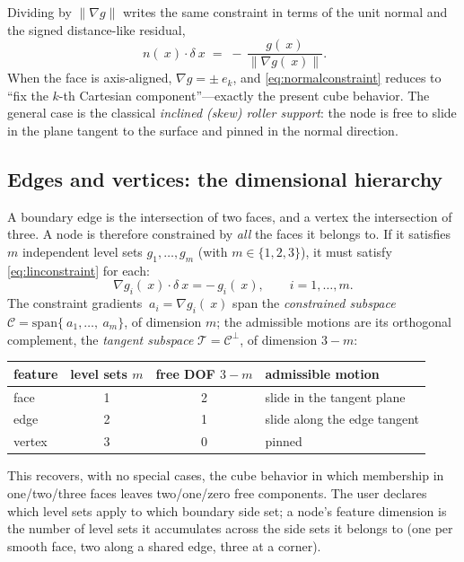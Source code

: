 \documentclass[11pt]{article}
\newcommand{\grad}{\nabla}
\newcommand{\norm}[1]{\lVert #1 \rVert}
\begin{document}
Dividing by $\norm{\grad g}$ writes the same constraint in terms of the unit
normal and the signed distance-like residual,
\begin{equation}
  ~n(~x)\cdot\delta~x \;=\; -\,\frac{g(~x)}{\norm{\grad g(~x)}}.
  \label{eq:normalconstraint}
\end{equation}
When the face is axis-aligned, $\grad g = \pm~e_k$, and
\eqref{eq:normalconstraint} reduces to ``fix the $k$-th Cartesian
component''---exactly the present cube behavior. The general case is the
classical \emph{inclined (skew) roller support}: the node is free to slide in
the plane tangent to the surface and pinned in the normal direction.

\subsection{Edges and vertices: the dimensional hierarchy}

A boundary edge is the intersection of two faces, and a vertex the intersection
of three. A node is therefore constrained by \emph{all} the faces it belongs
to. If it satisfies $m$ independent level sets $g_1,\dots,g_m$ (with
$m\in\{1,2,3\}$), it must satisfy \eqref{eq:linconstraint} for each:
\begin{equation}
  \grad g_i(~x)\cdot\delta~x = -\,g_i(~x), \qquad i = 1,\dots,m.
  \label{eq:multiconstraint}
\end{equation}
The constraint gradients $~a_i = \grad g_i(~x)$ span the \emph{constrained
subspace} $\mathcal{C} = \mathrm{span}\{~a_1,\dots,~a_m\}$, of dimension $m$;
the admissible motions are its orthogonal complement, the \emph{tangent
subspace} $\mathcal{T} = \mathcal{C}^\perp$, of dimension $3-m$:

\begin{center}
\begin{tabular}{lccl}
\toprule
feature & level sets $m$ & free DOF $3-m$ & admissible motion \\
\midrule
face   & 1 & 2 & slide in the tangent plane \\
edge   & 2 & 1 & slide along the edge tangent \\
vertex & 3 & 0 & pinned \\
\bottomrule
\end{tabular}
\end{center}

This recovers, with no special cases, the cube behavior in which membership in
one/two/three faces leaves two/one/zero free components. The user declares
which level sets apply to which boundary side set; a node's feature dimension is
the number of level sets it accumulates across the side sets it belongs to
(one per smooth face, two along a shared edge, three at a corner).
\end{document}
